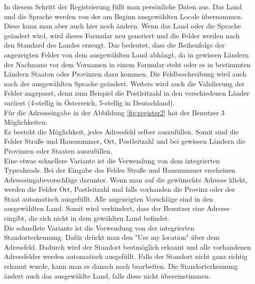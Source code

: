 In diesem Schritt der Registrierung füllt man persönliche Daten aus. Das Land und die Sprache werden von der am Beginn ausgewählten Locale übernommen. Diese kann man aber auch hier noch ändern. Wenn das Land oder die Sprache geändert wird, wird dieses Formular neu generiert und die Felder werden nach den Standard des Landes erzeugt. Das bedeutet, dass die Reihenfolge der angezeigten Felder von dem ausgewählten Land abhängt, da in gewissen Ländern der Nachname vor dem Vornamen in einem Formular steht oder es in bestimmten Ländern Staaten oder Provinzen dazu kommen. Die Feldbeschreibung wird auch nach der ausgewählten Sprache geändert. Weiters wird auch die Validierung der Felder angepasst, denn zum Beispiel die Postleitzahl in den verschiedenen Länder variiert (4-stellig in Österreich, 5-stellig in Deutschland). \\
Für die Adresseingabe in der Abbildung \ref{fig:register2} hat der Benutzer 3 Möglichkeiten:\\
Es besteht die Möglichkeit, jedes Adressfeld selber auszufüllen. Somit sind die Felder Straße und Hausnummer, Ort, Postleitzahl und bei gewissen Ländern die Provinzen oder Staaten auszufüllen.\\
Eine etwas schnellere Variante ist die Verwendung von dem integrierten Typeaheads. Bei der Eingabe des Feldes Straße und Hausnummer erscheinen Adresseingabevorschläge darunter. Wenn man auf die gewünschte Adresse klickt, werden die Felder Ort, Postleitzahl und falls vorhanden die Provinz oder der Staat automatisch ausgefüllt. Alle angezeigten Vorschläge sind in den ausgewählten Land. Somit wird verhindert, dass der Benutzer eine Adresse eingibt, die sich nicht in dem gewählten Land befindet.\\
Die schnellste Variante ist die Verwendung von der integrierten Standorterkennung. Dafür drückt man den "Use my location" über dem Adressfeld. Dadurch wird der Standort bestmöglich erkannt und alle vorhandenen Adressfelder werden automatisch ausgefüllt. Falls der Standort nicht ganz richtig erkannt wurde, kann man es danach noch bearbeiten. Die Standorterkennung ändert auch das ausgewählte Land, falls diese nicht übereinstimmen.
